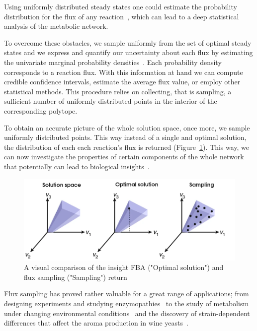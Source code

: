       Using uniformly distributed steady states one could estimate the probability
      distribution for the flux of any reaction~\citep{herrmann2019flux}, 
      which can lead to a deep statistical analysis of the metabolic network. 


      To overcome these obstacles, we sample uniformly from the set of optimal steady
      states and we express and quantify our uncertainty about each flux by estimating
      the univariate marginal probability densities~\citep{schellenberger2009use}. 
      Each probability density corresponds to a reaction flux. 
      With this information at hand we can compute credible confidence intervals, 
      estimate the average flux value, or employ other statistical methods. 
      This procedure relies on collecting, that is sampling, 
      a sufficient number of uniformly distributed points in the interior of the corresponding polytope.

      To obtain an accurate picture of the whole solution space,
      once more, we sample uniformly distributed points.
      This way instead of a single and optimal solution, 
      the distribution of each each reaction's flux is returned (Figure~\ref{fig:spaces}). 
      This way, we can now investigate the properties of certain components of the whole network 
      that potentially can lead to
      biological insights~\citep{palsson2015systems}.

      \begin{figure}[!h]
         \centering
         \includegraphics[width=.9\textwidth]{figures/solution_spaces_transparent.png}
         \caption[Flux sampling compared to FBA]{A visual comparison of the insight FBA ("Optimal solution") and flux sampling ("Sampling") return}
         \label{fig:spaces}
      \end{figure}


      Flux sampling has proved rather valuable for a great range of applications;
      from designing experiments and studying enzymopathies~\citep{price2004uniform}
      to the study of metabolism under changing environmental conditions~\citep{herrmann2019flux}
      and the discovery of strain-dependent differences 
      that affect the aroma production in wine yeasts~\citep{scott2021metabolic}. 
      
